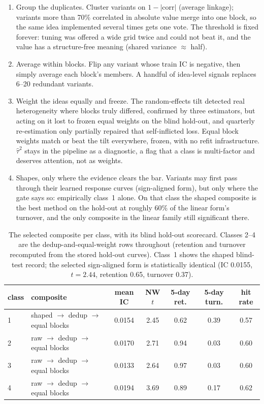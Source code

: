 \documentclass[11pt]{article}
\begin{document}
\begin{enumerate}
\item Group the duplicates. Cluster variants on $1-|\mathrm{corr}|$ (average
      linkage); variants more than 70\% correlated in absolute value merge into one block,
      so the same idea implemented several times gets one vote. The threshold is fixed
      forever: tuning was offered a wide grid twice and could not beat it, and the
      value has a structure-free meaning (shared variance $\approx$ half).
\item Average within blocks. Flip any variant whose train IC is negative, then
      simply average each block's members. A handful of idea-level signals replaces 6--20
      redundant variants.
\item Weight the ideas equally and freeze. The random-effects tilt
      detected real heterogeneity where blocks truly differed, confirmed by three
      estimators, but acting on it lost to frozen equal weights on the blind
      hold-out, and quarterly re-estimation only partially repaired that self-inflicted
      loss. Equal block weights match or beat the tilt everywhere, frozen, with no refit
      infrastructure.
      $\hat\tau^2$ stays in the pipeline as a diagnostic, a flag that a class is
      multi-factor and deserves attention, not as weights.
\item Shapes, only where the evidence clears the bar. Variants may first pass
      through their learned response curves (sign-aligned form), but only where the gate
      says so: empirically class~1 alone. On that class the shaped composite is the best
      method on the hold-out at roughly 60\% of the linear form's turnover, and the only
      composite in the linear family still significant there.
\end{enumerate}

\begin{table}[!htbp]
\centering
\small
\caption{The selected composite per class, with its blind hold-out scorecard. Classes
2--4 are the dedup-and-equal-weight rows throughout (retention and turnover recomputed
from the stored hold-out curves). Class~1 shows the shaped blind-test record; the
selected sign-aligned form is statistically identical (IC 0.0155, $t=2.44$, retention
0.65, turnover 0.37).}
\label{tab:ship}
\begin{tabular}{llccccc}
\toprule
class & composite & mean IC & NW $t$ & 5-day ret. & 5-day turn. & hit rate \\
\midrule
1 & shaped $\to$ dedup $\to$ equal blocks & 0.0154 & 2.45 & 0.62 & 0.39 & 0.57 \\
2 & raw $\to$ dedup $\to$ equal blocks & 0.0170 & 2.71 & 0.94 & 0.03 & 0.60 \\
3 & raw $\to$ dedup $\to$ equal blocks & 0.0133 & 2.64 & 0.97 & 0.03 & 0.60 \\
4 & raw $\to$ dedup $\to$ equal blocks & 0.0194 & 3.69 & 0.89 & 0.17 & 0.62 \\
\bottomrule
\end{tabular}
\end{table}
\end{document}
